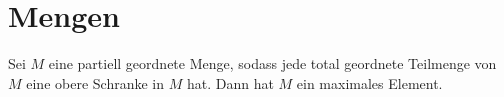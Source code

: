 \section{Mengen}
\begin{Lemma}\label{Satz:Zorn}
    Sei \(M\) eine partiell geordnete Menge, sodass jede total geordnete Teilmenge von \(M\) eine obere Schranke in \(M\) hat. Dann hat \(M\) ein maximales Element.
\end{Lemma}